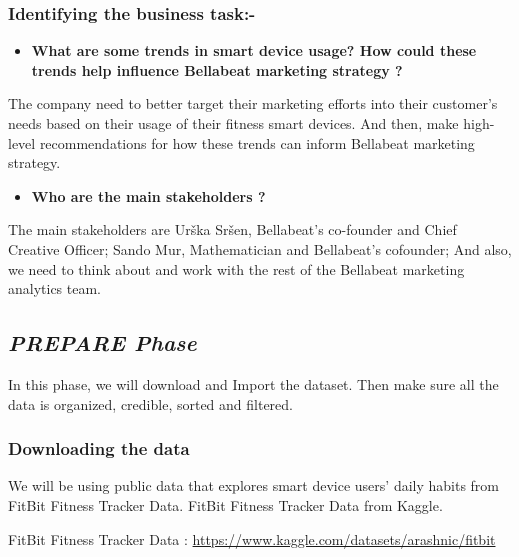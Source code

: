 \documentclass[
]{article}
\providecommand{\tightlist}{%
  \setlength{\itemsep}{0pt}\setlength{\parskip}{0pt}}
\begin{document}
\hypertarget{identifying-the-business-task-}{%
\subsubsection{Identifying the business
task:-}\label{identifying-the-business-task-}}

\begin{itemize}
\tightlist
\item
  \textbf{What are some trends in smart device usage? How could these
  trends help influence Bellabeat marketing strategy ?}
\end{itemize}

The company need to better target their marketing efforts into their
customer's needs based on their usage of their fitness smart devices.
And then, make high-level recommendations for how these trends can
inform Bellabeat marketing strategy.

\begin{itemize}
\tightlist
\item
  \textbf{Who are the main stakeholders ?}
\end{itemize}

The main stakeholders are Urška Sršen, Bellabeat's co-founder and Chief
Creative Officer; Sando Mur, Mathematician and Bellabeat's cofounder;
And also, we need to think about and work with the rest of the Bellabeat
marketing analytics team.

\hypertarget{prepare-phase}{%
\subsection{\texorpdfstring{\textbf{\emph{PREPARE
Phase}}}{PREPARE Phase}}\label{prepare-phase}}

In this phase, we will download and Import the dataset. Then make sure
all the data is organized, credible, sorted and filtered.

\hypertarget{downloading-the-data}{%
\subsubsection{Downloading the data}\label{downloading-the-data}}

We will be using public data that explores smart device users' daily
habits from FitBit Fitness Tracker Data. FitBit Fitness Tracker Data
from Kaggle.

FitBit Fitness Tracker Data :
\url{https://www.kaggle.com/datasets/arashnic/fitbit}
\end{document}
